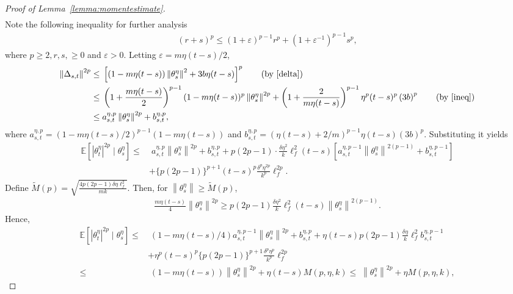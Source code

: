 \documentclass{article}
\newcommand{\norm}[1]{\left\lVert#1\right\rVert} %
\begin{document}
\begin{proof}[Proof of Lemma~\ref{lemma:momentestimate}]
\begin{align*}
	\end{align*}
	\endgroup
	Note the following inequality for further analysis
	\begin{align}\label{ineq}
		(r+s)^p \leq (1+\varepsilon)^{p-1} r^p + (1+\varepsilon^{-1})^{p-1} s^p,
	\end{align}
	where $p \geq 2, r, s, \geq 0 $ and $\varepsilon >0$. Letting $\varepsilon = m\eta (t-s) /2$,
	\begin{align*}
		\norm{\Delta_{s,t}}^{2p} \leq&\; \left[(1-m\eta (t-s)) \norm{\theta_s^\eta}^2 +3b  \eta (t-s) \right]^p \tag{by~\eqref{delta}}\\
		\leq&\; \left(1 +\frac{m\eta (t-s)}{2}\right)^{p-1} (1-m\eta (t-s))^p \norm{\theta_s^\eta}^{2p} + \left(1 + \frac{2}{m\eta (t-s)}\right)^{p-1} \eta^p (t-s)^p \left(3b \right)^p \tag{by~\eqref{ineq}}\\
		\leq&\; a_{s,t}^{\eta,p} \norm{\theta_s^\eta}^{2p} + b_{s,t}^{\eta, p},
	\end{align*}
	where $a_{s,t}^{\eta,p} = (1 - m\eta (t-s)/2)^{p-1} (1-m\eta (t-s))$ and $ b_{s,t}^{\eta, p} =(\eta (t-s)+ 2/m)^{p-1} \eta (t-s) \left(3b \right)^p$.
	Substituting it yields
	\begin{align*}
		\mathbb{E}[|\theta_t^\eta|^{2p} \mid \theta_s^\eta] \leq&\; a_{s,t}^{\eta,p} \norm{\theta_s^\eta}^{2p} + b_{s,t}^{\eta, p} + p (2p - 1) \cdot \frac{\delta \eta^2}{k} \ell_f^2 (t-s) \left[a_{s,t}^{\eta,p-1} \norm{\theta_s^\eta}^{2(p-1)} + b_{s,t}^{\eta, p-1}\right]\\
		&+ \{p(2p-1)\}^{p+1} (t-s)^p \frac{\delta^p \eta^{2p}}{k^{p}} \ell_f^{2p}.
	\end{align*}
	Define $\widetilde{M}(p) = \sqrt{\frac{4p(2p-1) \delta \eta \ell_f^2}{mk}}$. Then, for $\norm{\theta_s^\eta} \geq \widetilde{M}(p)$, 
	\begin{align*}
		\frac{m\eta (t-s)}{4} \norm{\theta_s^\eta}^{2p} \geq p(2p-1) \frac{\delta \eta^2}{k} \ell_f^2 (t-s) \norm{\theta_s^\eta}^{2(p-1)}.
	\end{align*}
	Hence,
	\begin{align*}
		\mathbb{E}[|\theta_t^\eta|^{2p} \mid \theta_s^\eta] \leq&\;  (1-m\eta(t-s)/4) a_{s,t}^{\eta, p-1} \norm{\theta_s^\eta}^{2p}+ b_{s,t}^{\eta, p} + \eta (t-s) p(2p-1) \frac{\delta \eta}{k} \ell_f^2 b_{s,t}^{\eta, p-1}\\
		&+ \eta^p (t-s)^p \{p(2p-1)\}^{p+1} \frac{\delta^p \eta^p}{k^p} \ell_f^{2p}\\
		\leq&\; (1-m\eta (t-s)) \norm{\theta_s^\eta}^{2p} + \eta(t-s) M(p,\eta, k)
		\leq\; \norm{\theta_s^\eta}^{2p} + \eta M(p,\eta, k),

\end{align*}
\end{proof}
\end{document}
